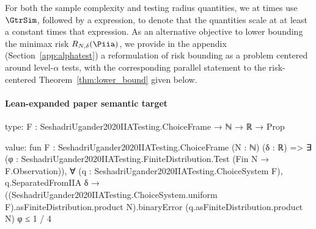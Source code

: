 \documentclass[10pt]{article}
\begin{document}
\begin{ReviewVerbatim}
	For both the sample complexity and testing radius quantities, we at times use $\GtrSim$, followed by a expression, to denote that the quantities scale at at least a constant times that expression. As an alternative objective to lower bounding the minimax risk $R_{N,\delta}(\Piia)$, we provide in the appendix (Section~\ref{app:alphatest}) a reformulation of risk bounding as a problem centered around level-$\alpha$ tests, with the corresponding parallel statement to the risk-centered Theorem~\ref{thm:lower_bound} given below.
\end{ReviewVerbatim}



\paragraph{Lean-expanded paper semantic target}
\begin{ReviewVerbatim}
type:
{F : SeshadriUgander2020IIATesting.ChoiceFrame} → ℕ → ℝ → Prop

value:
fun {F : SeshadriUgander2020IIATesting.ChoiceFrame} (N : ℕ) (δ : ℝ) =>
  ∃ (φ : SeshadriUgander2020IIATesting.FiniteDistribution.Test (Fin N → F.Observation)),
    ∀ (q : SeshadriUgander2020IIATesting.ChoiceSystem F),
      q.SeparatedFromIIA δ →
        ((SeshadriUgander2020IIATesting.ChoiceSystem.uniform F).asFiniteDistribution.product N).binaryError
            (q.asFiniteDistribution.product N) φ ≤
          1 / 4
\end{ReviewVerbatim}
\end{document}
